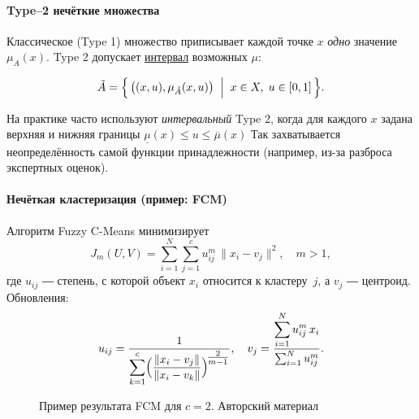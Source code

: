 \paragraph{Type–2 нечёткие множества}

Классическое (Type 1) множество
приписывает каждой точке $x$ \emph{одно} значение $\mu_A(x)$.
Type 2 допускает \underline{интервал} возможных $\mu$:

\[
  \tilde A
  = \Bigl\{\,\bigl((x,u),\mu_{\tilde A}(x,u)\bigr)
     \;\Bigm|\;
     x\in X,\;u\in[0,1]\,\Bigr\}.
\]

На практике часто используют
\emph{интервальный} Type 2,
когда для каждого $x$ задана верхняя и нижняя границы
\(
  \underline\mu(x)\le u\le\overline\mu(x)
\)
Так захватывается неопределённость
самой функции принадлежности
(например, из-за разброса экспертных оценок).
\bigskip
\paragraph{Нечёткая кластеризация (пример: FCM)}

Алгоритм Fuzzy C-Means минимизирует
\begin{equation}
  J_m(U,V) =
  \sum_{i=1}^N \sum_{j=1}^c
    u_{ij}^m\,\lVert x_i - v_j\rVert^2,
  \quad m>1,
\end{equation}
где $u_{ij}$ ― степень,
с которой объект $x_i$ относится к кластеру~$j$,
а $v_j$ ― центроид.  
Обновления:
\[
  u_{ij}
  = \frac{1}{\displaystyle
      \sum_{k=1}^c
      \Bigl(\frac{\lVert x_i-v_j\rVert}{\lVert x_i-v_k\rVert}\Bigr)^{\!\tfrac{2}{m-1}}},
  \quad
  v_j
  = \frac{\displaystyle
      \sum_{i=1}^N u_{ij}^m\,x_i}{
      \sum_{i=1}^N u_{ij}^m}.
\]

\begin{figure}[H]
\centering
{}
\caption{Пример результата FCM для $c=2$. Авторский материал}
\label{fig:fcm}
\end{figure}

